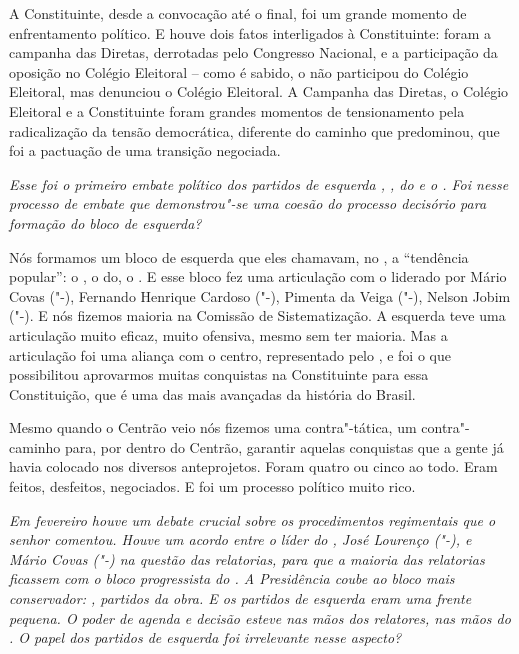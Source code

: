 A Constituinte, desde a convocação até o final, foi um grande momento de
enfrentamento político. E houve dois fatos interligados à Constituinte:
foram a campanha das Diretas, derrotadas pelo Congresso Nacional, e a
participação da oposição no Colégio Eleitoral -- como é sabido, o  não
participou do Colégio Eleitoral, mas denunciou o Colégio Eleitoral. A
Campanha das Diretas, o Colégio Eleitoral e a Constituinte foram grandes
momentos de tensionamento pela radicalização da tensão democrática,
diferente do caminho que predominou, que foi a pactuação de uma
transição negociada.

\medskip

\noindent\emph{Esse foi o primeiro embate político dos partidos de esquerda ,
, do e o . Foi nesse processo de embate que demonstrou"-se uma
coesão do processo decisório para formação do bloco de esquerda?}

Nós formamos um bloco de esquerda que eles chamavam,
no , a ``tendência popular'': o
, o do, o . E esse bloco fez
uma articulação com o  liderado por
Mário Covas ("-), Fernando
Henrique Cardoso ("-), Pimenta
da Veiga ("-), Nelson Jobim
("-). E nós fizemos maioria na Comissão de Sistematização. A
esquerda teve uma articulação muito eficaz, muito ofensiva, mesmo sem
ter maioria. Mas a articulação foi uma aliança com o centro,
representado pelo , e foi o que possibilitou aprovarmos muitas
conquistas na Constituinte para essa Constituição, que é uma das mais
avançadas da história do Brasil.

Mesmo quando o Centrão veio nós fizemos uma contra"-tática, um
contra"-caminho para, por dentro do Centrão, garantir aquelas conquistas
que a gente já havia colocado nos diversos anteprojetos. Foram quatro ou
cinco ao todo. Eram feitos, desfeitos, negociados. E foi um processo
político muito rico.

\medskip

\noindent\emph{Em fevereiro houve um debate crucial sobre os procedimentos
regimentais que o senhor comentou. Houve um acordo entre o líder do ,
José Lourenço ("-), e Mário
Covas ("-) na questão das
relatorias, para que a maioria das relatorias ficassem com o bloco
progressista do . A Presidência coube ao bloco mais conservador:
, partidos da obra. E os partidos de esquerda eram uma frente
pequena. O poder de agenda e decisão esteve nas mãos dos relatores, nas
mãos do . O papel dos partidos de esquerda foi irrelevante nesse
aspecto?}

